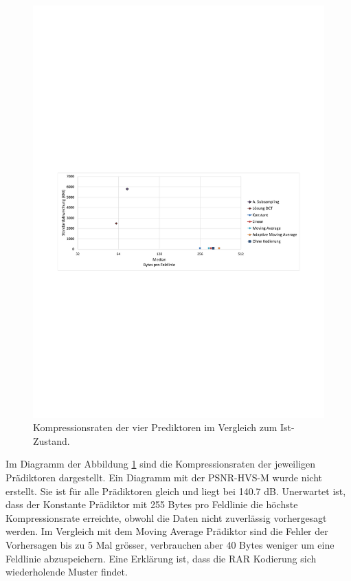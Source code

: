\begin{figure}[!htbp]
	\center
	\includegraphics[trim = 1.8cm 11cm 1.8cm 12.5cm, clip=true,width=1\textwidth,keepaspectratio]{./pictures/resultate/loesung2/variante0/resultate.pdf}
	\caption{Kompressionsraten der vier Prediktoren im Vergleich zum Ist-Zustand.}
	\label{resultate:loesung2:simple:resultate}
\end{figure}
Im Diagramm der Abbildung \ref{resultate:loesung2:simple:resultate} sind die Kompressionsraten der jeweiligen Prädiktoren dargestellt. Ein Diagramm mit der PSNR-HVS-M wurde nicht erstellt. Sie ist für alle Prädiktoren gleich und liegt bei 140.7 dB. Unerwartet ist, dass der Konstante Prädiktor mit 255 Bytes pro Feldlinie die höchste Kompressionsrate erreichte, obwohl die Daten nicht zuverlässig vorhergesagt werden. Im Vergleich mit dem Moving Average Prädiktor sind die Fehler der Vorhersagen bis zu 5 Mal grösser, verbrauchen aber 40 Bytes weniger um eine Feldlinie abzuspeichern. Eine Erklärung ist, dass die RAR Kodierung sich wiederholende Muster findet.

